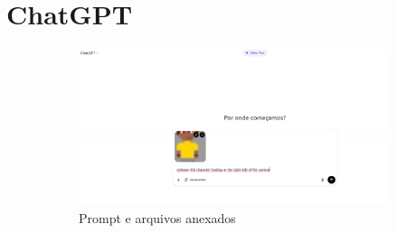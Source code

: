 \FloatBarrier
\section{ChatGPT}
\label{s.chatGPTApendice}


\begin{figure}[htbp]
    \centering
    \caption{\small Processo da utilização 1 do ChatGPT em julho/2025}
    \label{fig:chatGPT1}

    \begin{subfigure}{0.75\linewidth}
        \includegraphics[width=1\linewidth]{figs/chatGPT/visao_lateral/tela1_pixel.PNG}
        \caption{\small Prompt e arquivos anexados}
        \label{fig:chatGPT1a}
    \end{subfigure}
    \begin{subfigure}{0.2\linewidth}

\end{subfigure}
\end{figure}
